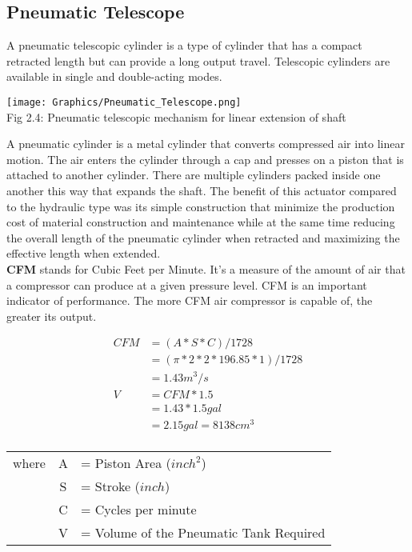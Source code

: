 \documentclass[a4,10pt]{report}
\begin{document}
\subsection{Pneumatic Telescope}
A pneumatic telescopic cylinder is a type of cylinder that has a compact retracted length but can provide a long output travel. Telescopic cylinders are available in single and double-acting modes. \\
\begin{center}
    \texttt{[image: Graphics/Pneumatic\_Telescope.png]} \\
    \normalsize{Fig 2.4: Pneumatic telescopic mechanism for linear extension of shaft}
\end{center}
A pneumatic cylinder is a metal cylinder that converts compressed air into linear motion. The air enters the cylinder through a cap and presses on a piston that is attached to another cylinder. There are multiple cylinders packed inside one another this way that expands the shaft.\cite{pneumatic} The benefit of this actuator compared to the hydraulic type was its simple construction that minimize the production cost of material construction and maintenance while at the same time reducing the overall length of the pneumatic cylinder when retracted and maximizing the effective length when extended. 
\vspace{2mm} \\
\textbf{CFM} stands for Cubic Feet per Minute. It's a measure of the amount of air that a compressor can produce at a given pressure level. CFM is an important indicator of performance. The more CFM air compressor is capable of, the greater its output.\cite{numerical_pneumatic} \\
\begin{center}
\begin{equation*}
    \begin{split}
        CFM &= (A*S*C)/1728 \\
        &= (\pi*2*2*196.85*1)/1728 \\
        &= 1.43 m^3/s \\
        V &= CFM*1.5 \\
        &= 1.43*1.5 gal \\
        &= 2.15 gal = 8138 cm^3 \\
    \end{split}
\end{equation*}
\begin{tabular}{c c l} 
where &A &= Piston Area ($inch^2$) \\
&S &= Stroke ($inch$) \\
&C &= Cycles per minute \\
&V &= Volume of the Pneumatic Tank Required
\end{tabular}
\end{center}
\end{document}
